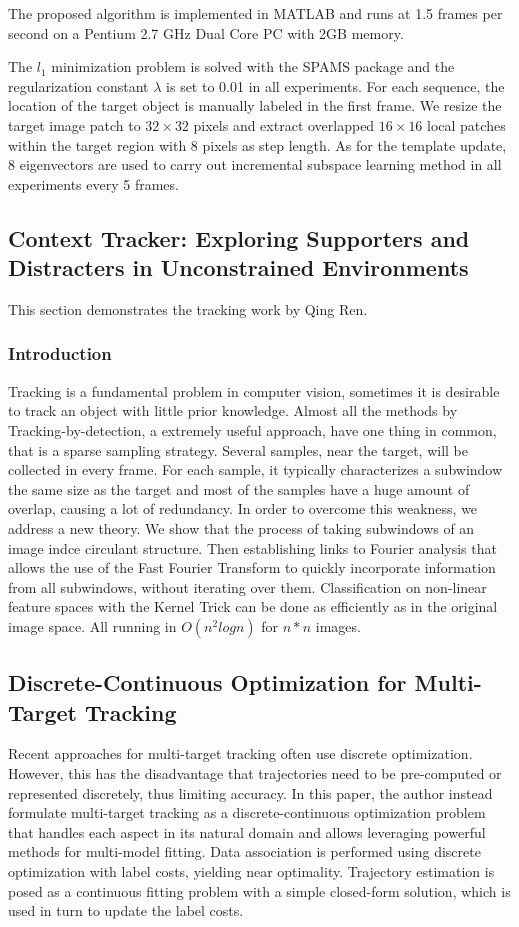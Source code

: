 \documentclass{acm_proc_article-sp}
\begin{document}
The proposed algorithm is implemented in MATLAB and runs at 1.5 frames per second on a Pentium 2.7 GHz Dual Core PC with 2GB memory.

The $l_1$ minimization problem is solved with the SPAMS package and the regularization constant $\lambda$ is set to 0.01 in all experiments. For each sequence, the location of the target object is manually labeled in the first frame. We resize the target image patch to $32\times 32$ pixels and extract overlapped $16\times16$ local patches within the target region with 8 pixels as step length. As for the template update, 8 eigenvectors are used to carry out incremental subspace learning method in all experiments every 5 frames.

\subsection{Context Tracker: Exploring Supporters and Distracters in Unconstrained Environments}
This section demonstrates the tracking work by Qing Ren.

\subsubsection{Introduction}
Tracking is a fundamental problem in computer vision, sometimes it is desirable to track an object with little prior knowledge. Almost all the methods by Tracking-by-detection, a extremely useful approach, have one thing in common, that is a sparse sampling strategy. Several samples, near the target, will be collected in every frame. For each sample, it typically characterizes a subwindow the same size as the target and most of the samples have a huge amount of overlap, causing a lot of redundancy. In order to overcome this weakness, we address a new theory. We show that the process of taking subwindows of an image indce circulant structure. Then establishing links to Fourier analysis that allows the use of the Fast Fourier Transform to quickly incorporate information from all subwindows, without iterating over them. Classification on non-linear feature spaces with the Kernel Trick can be done as efficiently as in the original image space. All running in $O(n^2 logn)$ for $n * n$ images.

\subsection{Discrete-Continuous Optimization for Multi-Target Tracking}
Recent approaches for multi-target tracking often use discrete optimization. However, this has the disadvantage that trajectories need to be pre-computed or represented discretely, thus limiting accuracy. In this paper, the author instead formulate multi-target tracking as a discrete-continuous optimization problem that handles each aspect in its natural domain and allows leveraging powerful methods for multi-model fitting. Data association is performed using discrete optimization with label costs, yielding near optimality. Trajectory estimation is posed as a continuous fitting problem with a simple closed-form solution, which is used in turn to update the label costs.
\end{document}
